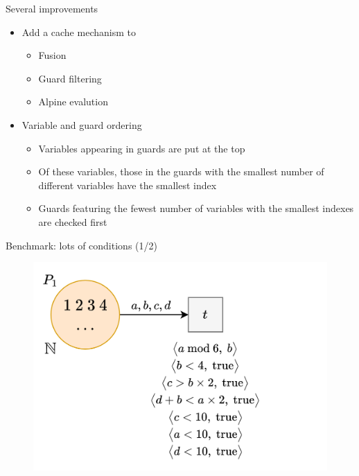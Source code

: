 \documentclass[10pt]{beamer}
\begin{document}
\begin{frame}[fragile]{Several improvements}
    \begin{itemize}
        \setlength\itemsep{1.15em}
        \item Add a cache mechanism to \vspace{\topsep}\begin{itemize}
            \setlength\itemsep{0.45em}
            \item Fusion
            \item Guard filtering
            \item Alpine evalution
        \end{itemize}
        \item Variable and guard ordering\vspace{\topsep}\begin{itemize}
            \setlength\itemsep{0.45em}
            \item Variables appearing in guards are put at the top
            \item Of these variables, those in the guards with the smallest number of different variables have the
              smallest index
            \item Guards featuring the fewest number of variables with the smallest indexes are checked first 
        \end{itemize}
    \end{itemize}
\end{frame}

\begin{frame}[fragile]{Benchmark: lots of conditions (1/2)}
    \begin{figure}
        \centering
        \includegraphics[width=1.0\textwidth]{lotsc.png}
    \end{figure}
\end{frame}
\end{document}
